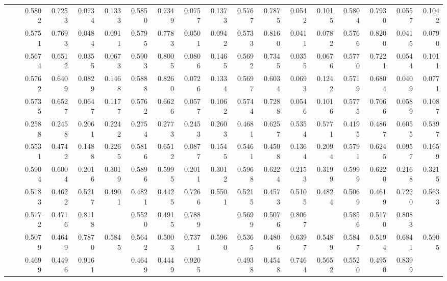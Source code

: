 \begin{table*}[t]
{\begin{tabular}{|l|l|r|r|r|r|r|r|r|r|r|r|r|r|r|r|r|r|}
			\multirow{11}{*}{\rotatebox{90}{\Arxiv}} 
			&\ATC       & 0.5802 & 0.7253 & 0.0734 & 0.1333 & 0.5850 & 0.7349 & 0.0757 & 0.1373 & 0.5767 & 0.7875 & 0.0542 & 0.1015 & 0.5804 & 0.7930 & 0.0557 & 0.1042 \\
			&\CTC       & 0.5751 & 0.7693 & 0.0484 & 0.0911 & 0.5795 & 0.7783 & 0.0501 & 0.0942 & 0.5733 & 0.8160 & 0.0411 & 0.0782 & 0.5766 & 0.8200 & 0.0415 & 0.0790 \\\cline{2-18}
			&\MAML      & 0.5674 & 0.6512 & 0.0355 & 0.0673 & 0.5903 & 0.8005 & 0.0806 & 0.1465 & 0.5692 & 0.7345 & 0.0355 & 0.0676 & 0.5770 & 0.7221 & 0.0544 & 0.1011 \\
			&\Reptile   & 0.5762 & 0.6409 & 0.0829 & 0.1468 & 0.5888 & 0.8260 & 0.0726 & 0.1334 & 0.5697 & 0.6034 & 0.0693 & 0.1242 & 0.5719 & 0.6804 & 0.0409 & 0.0771 \\
			&\Featrans  & 0.5735 & 0.6527 & 0.0647 & 0.1177 & 0.5762 & 0.6626 & 0.0577 & 0.1062 & 0.5744 & 0.7288 & 0.0546 & 0.1016 & 0.5775 & 0.7066 & 0.0589 & 0.1087 \\
			&\PN        & 0.2588 & 0.2458 & 0.2061 & 0.2242 & 0.2754 & 0.2773 & 0.2453 & 0.2603 & 0.4681 & 0.6257 & 0.5354 & \cellcolor{LightCyan}0.5771 & 0.4195 & 0.4867 & 0.6055 & 0.5397 \\\cline{2-18}
			&\Supervise & 0.5531 & 0.4742 & 0.1488 & 0.2265 & 0.5816 & 0.6512 & 0.0877 & 0.1545 & 0.5461 & 0.4508 & 0.1364 & 0.2094 & 0.5791 & 0.6245 & 0.0957 & 0.1659 \\
			&\ICSGNN    & 0.5904 & 0.6004 & 0.2016 & 0.3019 & 0.5896 & 0.5995 & 0.2011 & 0.3012 & 0.5968 & 0.6224 & 0.2153 & 0.3199 & 0.5999 & 0.6220 & 0.2168 & 0.3215 \\
			&\AQDGNN    & 0.5183 & 0.4622 & 0.5217 & 0.4901 & 0.4821 & 0.4425 & 0.7266 & 0.5501 & 0.5215 & 0.4573 & 0.5105 & 0.4824 & 0.5069 & 0.4619 & 0.7220 & 0.5633 \\\cline{2-18}
			&\CGNPIP    & 0.5172 & 0.4716 & 0.8118 & \cellcolor{LightCyan}{0.5966} & 0.5520 & 0.4915 & 0.7889 & \cellcolor{LightRed}{0.6057} & 0.5699 & 0.5076 & 0.8067 & \cellcolor{LightRed}{0.6231} & 0.5856 & 0.5170 & 0.8083 & \cellcolor{LightRed}{0.6306} \\
			&\CGNPMLP   & 0.5079 & 0.4649 & 0.7870 & 0.5845 & 0.5642 & 0.5003 & 0.7371 & 0.5960 & 0.5365 & 0.4806 & 0.6397 & 0.5489 & 0.5847 & 0.5194 & 0.6841 & 0.5905 \\
			&\CGNPGNN   & 0.4699 & 0.4496 & 0.9161 & \cellcolor{LightRed}{0.6032} &  0.4649 & 0.4449 & 0.9205 & \cellcolor{LightCyan}{0.5998} & 0.4938 & 0.4548 & 0.7464 & 0.5652  &0.5520	&0.4950	&0.8399	&\cellcolor{LightCyan}{0.6229}\\\hline\hline
			

\end{tabular}}
\end{table*}
